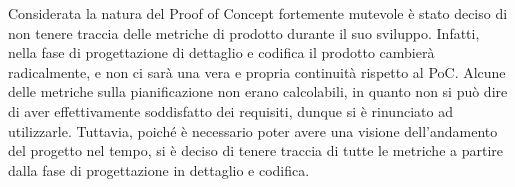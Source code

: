Considerata la natura del Proof of Concept fortemente mutevole è stato deciso di non 
tenere traccia delle metriche di prodotto durante il suo sviluppo. Infatti, nella fase di 
progettazione di dettaglio e codifica il prodotto cambierà radicalmente, 
e non ci sarà una vera e propria continuità rispetto al PoC. Alcune delle metriche sulla 
pianificazione non erano calcolabili, in quanto non si può dire di aver effettivamente 
soddisfatto dei requisiti, dunque si è rinunciato ad utilizzarle. Tuttavia, poiché è necessario poter 
avere una visione dell'andamento del progetto nel tempo, si è deciso di tenere traccia di tutte 
le metriche a partire dalla fase di progettazione in dettaglio e codifica.